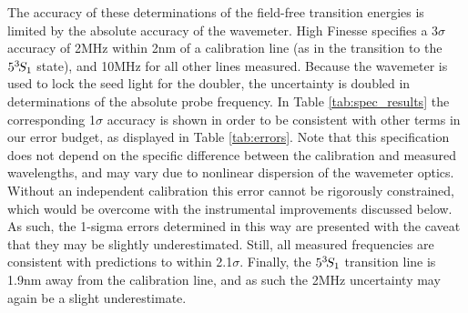 	The accuracy of these determinations of the field-free transition energies is limited by the absolute accuracy of the wavemeter.
	High Finesse specifies \cite{HighFinesseDoc} a 3$\sigma$ accuracy of 2MHz within 2nm of a calibration line (as in the transition to the $5^{3\!} S_1$ state), and 10MHz for all other lines measured.
	Because the wavemeter is used to lock the seed light for the doubler, the uncertainty is doubled in determinations of the absolute probe frequency.
	In Table \ref{tab:spec_results} the corresponding 1$\sigma$ accuracy is shown in order to be consistent with other terms in our error budget, as displayed in Table \ref{tab:errors}.
	Note that this specification does not depend on the specific difference between the calibration and measured wavelengths, and may vary due to nonlinear dispersion of the wavemeter optics.
	Without an independent calibration this error cannot be rigorously constrained, which would be overcome with the instrumental improvements discussed below.
	As such, the 1-sigma errors determined in this way are presented with the caveat that they may be slightly underestimated.
	Still, all measured frequencies are consistent with predictions to within 2.1$\sigma$.
	Finally, the $5^{3\!} S_1$ transition line is 1.9nm away from the calibration line, and as such the 2MHz uncertainty may again be a slight underestimate.

